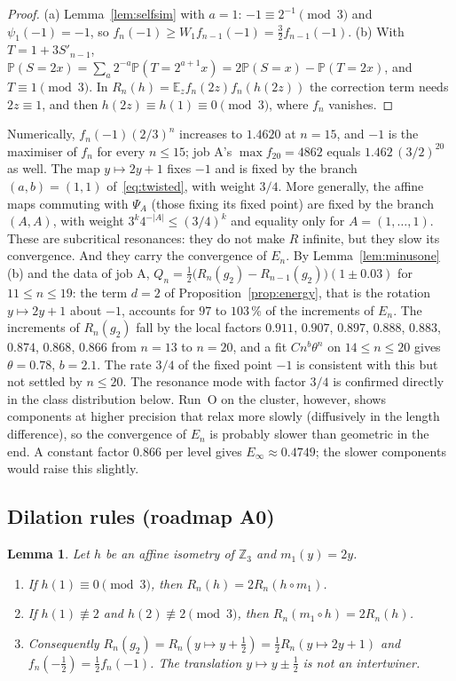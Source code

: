 \documentclass[11pt]{article}
\newtheorem{lemma}[theorem]{Lemma}
\theoremstyle{remark}
\newcommand{\Z}{\mathbb Z}
\newcommand{\E}{\mathbb E}
\newcommand{\Prob}{\mathbb P}
\begin{document}
\begin{proof}
(a) Lemma~\ref{lem:selfsim} with $a=1$: $-1\equiv2^{-1}\pmod3$ and $\psi_1(-1)=-1$, so $f_n(-1)\ge W_1f_{n-1}(-1)=\frac32f_{n-1}(-1)$. (b) With $T=1+3S'_{n-1}$, $\Prob(S=2x)=\sum_a2^{-a}\Prob(T=2^{a+1}x)=2\Prob(S=x)-\Prob(T=2x)$, and $T\equiv1\pmod3$. In $R_n(h)=\E_zf_n(2z)f_n(h(2z))$ the correction term needs $2z\equiv1$, and then $h(2z)\equiv h(1)\equiv0\pmod3$, where $f_n$ vanishes.
\end{proof}

Numerically, $f_n(-1)(2/3)^n$ increases to $1.4620$ at $n=15$, and $-1$ is the maximiser of $f_n$ for every $n\le15$; job A's $\max f_{20}=4862$ equals $1.462\,(3/2)^{20}$ as well. The map $y\mapsto2y+1$ fixes $-1$ and is fixed by the branch $(a,b)=(1,1)$ of~\eqref{eq:twisted}, with weight $3/4$. More generally, the affine maps commuting with $\Psi_A$ (those fixing its fixed point) are fixed by the branch $(A,A)$, with weight $3^k4^{-|A|}\le(3/4)^k$ and equality only for $A=(1,\dots,1)$. These are subcritical resonances: they do not make $R$ infinite, but they slow its convergence. And they carry the convergence of $E_n$. By Lemma~\ref{lem:minusone}(b) and the data of job A, $Q_n=\frac12\bigl(R_n(g_2)-R_{n-1}(g_2)\bigr)(1\pm0.03)$ for $11\le n\le19$: the term $d=2$ of Proposition~\ref{prop:energy}, that is the rotation $y\mapsto2y+1$ about $-1$, accounts for $97$ to $103$\,\% of the increments of $E_n$. The increments of $R_n(g_2)$ fall by the local factors $0.911$, $0.907$, $0.897$, $0.888$, $0.883$, $0.874$, $0.868$, $0.866$ from $n=13$ to $n=20$, and a fit $Cn^b\theta^n$ on $14\le n\le20$ gives $\theta=0.78$, $b=2.1$. The rate $3/4$ of the fixed point $-1$ is consistent with this but not settled by $n\le20$. The resonance mode with factor $3/4$ is confirmed directly in the class distribution below. Run~O on the cluster, however, shows components at higher precision that relax more slowly (diffusively in the length difference), so the convergence of $E_n$ is probably slower than geometric in the end. A constant factor $0.866$ per level gives $E_\infty\approx0.4749$; the slower components would raise this slightly.

\subsection*{Dilation rules (roadmap A0)}
\begin{lemma}\label{lem:dilation}
Let $h$ be an affine isometry of $\Z_3$ and $m_1(y)=2y$.
\begin{enumerate}
\item[(a)] If $h(1)\equiv0\pmod3$, then $R_n(h)=2R_n(h\circ m_1)$.
\item[(b)] If $h(1)\not\equiv2$ and $h(2)\not\equiv2\pmod3$, then $R_n(m_1\circ h)=2R_n(h)$.
\item[(c)] Consequently $R_n(g_2)=R_n(y\mapsto y+\tfrac12)=\tfrac12R_n(y\mapsto2y+1)$ and $f_n(-\tfrac12)=\tfrac12f_n(-1)$. The translation $y\mapsto y\pm\frac12$ is not an intertwiner.
\end{enumerate}
\end{lemma}
\end{document}
